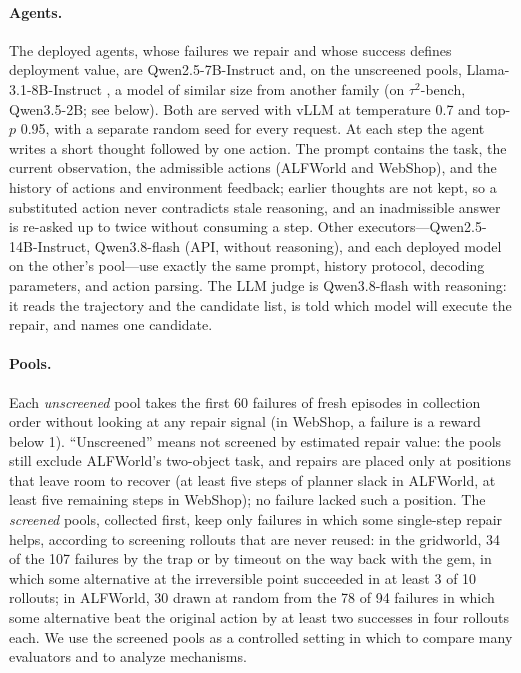 \documentclass{article}
\newcommand{\tautwo}{$\tau^2$-bench}
\theoremstyle{plain}
\theoremstyle{definition}
\theoremstyle{remark}
\begin{document}
\paragraph{Agents.}
The deployed agents, whose failures we repair and whose success defines deployment value, are Qwen2.5-7B-Instruct \citep{qwen2025qwen25} and, on the unscreened pools, Llama-3.1-8B-Instruct \citep{grattafiori2024llama3}, a model of similar size from another family (on \tautwo{}, Qwen3.5-2B; see below). Both are served with vLLM \citep{kwon2023vllm} at temperature 0.7 and top-$p$ 0.95, with a separate random seed for every request. At each step the agent writes a short thought followed by one action. The prompt contains the task, the current observation, the admissible actions (ALFWorld and WebShop), and the history of actions and environment feedback; earlier thoughts are not kept, so a substituted action never contradicts stale reasoning, and an inadmissible answer is re-asked up to twice without consuming a step. Other executors---Qwen2.5-14B-Instruct, Qwen3.8-flash \citep{qwen2026flash} (API, without reasoning), and each deployed model on the other's pool---use exactly the same prompt, history protocol, decoding parameters, and action parsing. The LLM judge is Qwen3.8-flash with reasoning: it reads the trajectory and the candidate list, is told which model will execute the repair, and names one candidate.

\paragraph{Pools.}
Each \emph{unscreened} pool takes the first 60 failures of fresh episodes in collection order without looking at any repair signal (in WebShop, a failure is a reward below 1). ``Unscreened'' means not screened by estimated repair value: the pools still exclude ALFWorld's two-object task, and repairs are placed only at positions that leave room to recover (at least five steps of planner slack in ALFWorld, at least five remaining steps in WebShop); no failure lacked such a position. The \emph{screened} pools, collected first, keep only failures in which some single-step repair helps, according to screening rollouts that are never reused: in the gridworld, 34 of the 107 failures by the trap or by timeout on the way back with the gem, in which some alternative at the irreversible point succeeded in at least 3 of 10 rollouts; in ALFWorld, 30 drawn at random from the 78 of 94 failures in which some alternative beat the original action by at least two successes in four rollouts each. We use the screened pools as a controlled setting in which to compare many evaluators and to analyze mechanisms.
\end{document}
